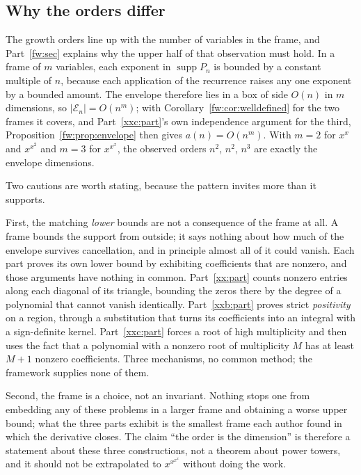 \documentclass[11pt,a4paper]{article}
\numberwithin{equation}{section}
\theoremstyle{definition}
\theoremstyle{remark}
\theoremstyle{plain}
\DeclareMathOperator{\supp}{supp}
\newcommand{\EE}{\mathcal E}
\begin{document}
\subsection{Why the orders differ}\label{syn:orders}

The growth orders line up with the number of variables in the frame, and
Part~\ref{fw:sec} explains why the upper half of that observation must hold.  In
a frame of $m$ variables, each exponent in $\supp P_n$ is bounded by a constant
multiple of $n$, because each application of the recurrence raises any one
exponent by a bounded amount.  The envelope therefore lies in a box of side
$O(n)$ in $m$ dimensions, so $|\EE_n|=O(n^m)$; with
Corollary~\ref{fw:cor:welldefined} for the two frames it covers, and
Part~\ref{xxc:part}'s own independence argument for the third,
Proposition~\ref{fw:prop:envelope} then gives $a(n)=O(n^m)$.  With $m=2$ for
$x^x$ and $x^{x^2}$ and $m=3$ for $x^{x^x}$, the observed orders $n^2$, $n^2$,
$n^3$ are exactly the envelope dimensions.

Two cautions are worth stating, because the pattern invites more than it
supports.

First, the matching \emph{lower} bounds are not a consequence of the frame at
all.  A frame bounds the support from outside; it says nothing about how much of
the envelope survives cancellation, and in principle almost all of it could
vanish.  Each part proves its own lower bound by exhibiting coefficients that
are nonzero, and those arguments have nothing in common.  Part~\ref{xx:part}
counts nonzero entries along each diagonal of its triangle, bounding the zeros
there by the degree of a polynomial that cannot vanish identically.
Part~\ref{xxb:part} proves strict \emph{positivity} on a region, through a
substitution that turns its coefficients into an integral with a
sign-definite kernel.  Part~\ref{xxc:part} forces a root of high multiplicity
and then uses the fact that a polynomial with a nonzero root of multiplicity
$M$ has at least $M+1$ nonzero coefficients.  Three mechanisms, no common
method; the framework supplies none of them.

Second, the frame is a choice, not an invariant.  Nothing stops one from
embedding any of these problems in a larger frame and obtaining a worse upper
bound; what the three parts exhibit is the smallest frame each author found in
which the derivative closes.  The claim ``the order is the dimension'' is
therefore a statement about these three constructions, not a theorem about power
towers, and it should not be extrapolated to $x^{x^{x^x}}$ without doing the
work.
\end{document}
